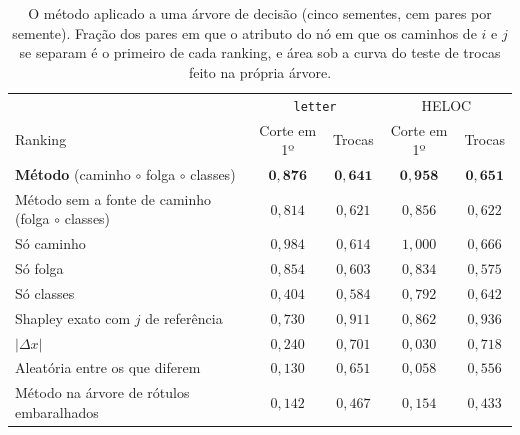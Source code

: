 \begin{table}[pos=htbp]
\centering
\caption{O método aplicado a uma árvore de decisão (cinco sementes, cem pares por semente). Fração dos pares em que o atributo do nó em que os caminhos de $i$ e $j$ se separam é o primeiro de cada ranking, e área sob a curva do teste de trocas feito na própria árvore.}
\label{tab:res_arvore}
\footnotesize
\setlength{\tabcolsep}{4pt}
\begin{tabular}{l c c c c}
\hline
 & \multicolumn{2}{c}{\texttt{letter}} & \multicolumn{2}{c}{HELOC} \\
Ranking & Corte em 1º & Trocas & Corte em 1º & Trocas \\
\hline
\textbf{Método} (caminho $\circ$ folga $\circ$ classes) & $\mathbf{0{,}876}$ & $\mathbf{0{,}641}$ & $\mathbf{0{,}958}$ & $\mathbf{0{,}651}$ \\
Método sem a fonte de caminho (folga $\circ$ classes) & $0{,}814$ & $0{,}621$ & $0{,}856$ & $0{,}622$ \\
Só caminho & $0{,}984$ & $0{,}614$ & $1{,}000$ & $0{,}666$ \\
Só folga & $0{,}854$ & $0{,}603$ & $0{,}834$ & $0{,}575$ \\
Só classes & $0{,}404$ & $0{,}584$ & $0{,}792$ & $0{,}642$ \\
Shapley exato com $j$ de referência & $0{,}730$ & $0{,}911$ & $0{,}862$ & $0{,}936$ \\
$|\Delta x|$ & $0{,}240$ & $0{,}701$ & $0{,}030$ & $0{,}718$ \\
Aleatória entre os que diferem & $0{,}130$ & $0{,}651$ & $0{,}058$ & $0{,}556$ \\
Método na árvore de rótulos embaralhados & $0{,}142$ & $0{,}467$ & $0{,}154$ & $0{,}433$ \\
\hline
\end{tabular}
\end{table}

